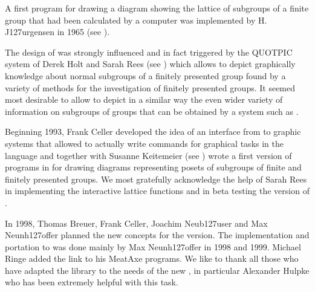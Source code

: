 
A first program for drawing a diagram showing the lattice of subgroups
of  a finite  group  that  had  been   calculated by  a  computer  was
implemented by H. J\accent127urgensen in 1965 (see \cite{FJ65}).

The  design of {\XGAP} was strongly  influenced and  in fact triggered by
the  QUOTPIC system of  Derek Holt  and  Sarah Rees (see \cite{HR91})
%
which allows to depict graphically knowledge about normal subgroups of
a finitely presented group found by a variety of methods for the
investigation of finitely presented groups.  It seemed most desirable
to allow to depict in a similar way the even wider variety of
information on subgroups of groups that can be obtained by a system
such as {\GAP}.

Beginning 1993,  Frank Celler developed the  idea of an interface from
{\GAP}   to graphic systems that  allowed  to actually write commands for
graphical   tasks  in  the {\GAP}  language   and  together with  Susanne
Keitemeier  (see \cite{SK95}) wrote a first version
of   programs in {\XGAP}  for   drawing diagrams  representing posets  of
subgroups of finite and finitely presented groups.  We most gratefully
acknowledge  the  help of  Sarah Rees in  implementing the interactive
lattice functions and in beta testing the {} version of {\XGAP}.

In 1998, Thomas Breuer, Frank Celler, Joachim Neub\accent127user and Max
Neunh\accent127offer planned the new concepts for the {}
version. The implementation and portation to {} was done mainly by Max
Neunh\accent127offer in 1998 and 1999. Michael Ringe added the link to his
MeatAxe programs. We like to thank all those who have adapted the {\GAP} 
library to the needs of the new {\XGAP}, in particular Alexander Hulpke who 
has been extremely helpful with this task.

